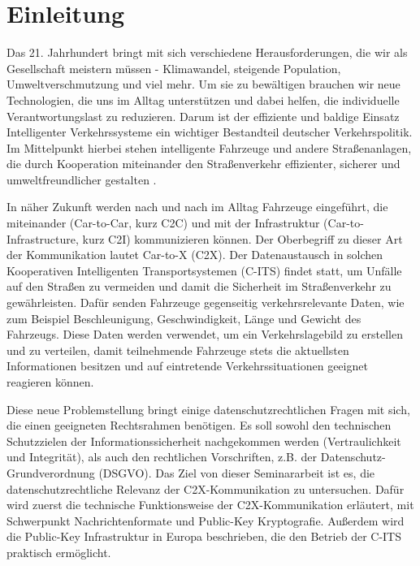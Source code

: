 
\section{Einleitung}
\label{ch:Introduction}


Das 21. Jahrhundert bringt mit sich verschiedene Herausforderungen, die wir als Gesellschaft meistern müssen - Klimawandel, steigende Population, Umweltverschmutzung und viel mehr. Um sie zu bewältigen brauchen wir neue Technologien, die uns im Alltag unterstützen und dabei helfen, die individuelle Verantwortungslast zu reduzieren. Darum ist der effiziente und baldige Einsatz Intelligenter Verkehrssysteme ein wichtiger Bestandteil deutscher Verkehrspolitik. Im Mittelpunkt hierbei stehen intelligente Fahrzeuge und andere Straßenanlagen, die durch Kooperation miteinander den Straßenverkehr effizienter, sicherer und umweltfreundlicher gestalten \cite{BMVI}.  

In näher Zukunft werden nach und nach im Alltag Fahrzeuge eingeführt, die miteinander (Car-to-Car, kurz C2C) und mit der Infrastruktur (Car-to-Infrastructure, kurz C2I) kommunizieren können. Der Oberbegriff zu dieser Art der Kommunikation lautet Car-to-X (C2X). Der Datenaustausch in solchen Kooperativen Intelligenten Transportsystemen (C-ITS) findet statt, um Unfälle auf den Straßen zu vermeiden und damit die Sicherheit im Straßenverkehr zu gewährleisten. Dafür senden Fahrzeuge gegenseitig verkehrsrelevante Daten, wie zum Beispiel Beschleunigung, Geschwindigkeit, Länge und Gewicht des Fahrzeugs. Diese Daten werden verwendet, um ein Verkehrslagebild zu erstellen und zu verteilen, damit teilnehmende Fahrzeuge stets die aktuellsten Informationen besitzen und auf eintretende Verkehrssituationen geeignet reagieren können. 

Diese neue Problemstellung bringt einige datenschutzrechtlichen Fragen mit sich, die einen geeigneten Rechtsrahmen benötigen. Es soll sowohl den technischen Schutzzielen der Informationssicherheit nachgekommen werden (Vertraulichkeit und Integrität), als auch den rechtlichen Vorschriften, z.B. der Datenschutz-Grundverordnung (DSGVO). Das Ziel von dieser Seminararbeit ist es, die datenschutzrechtliche Relevanz der C2X-Kommunikation zu untersuchen. Dafür wird zuerst die technische Funktionsweise der C2X-Kommunikation erläutert, mit Schwerpunkt Nachrichtenformate und Public-Key Kryptografie. Außerdem wird die Public-Key Infrastruktur in Europa beschrieben, die den Betrieb der C-ITS praktisch ermöglicht. 

